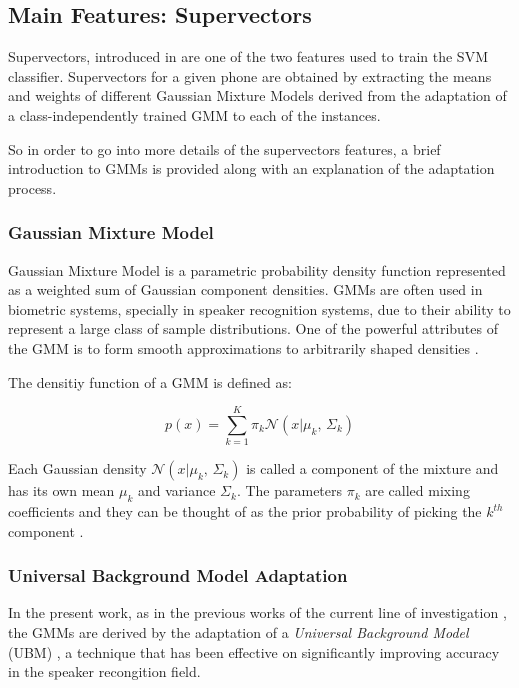 \subsection{Main Features: Supervectors}

Supervectors, introduced in \cite{main} are one of the two features used to train the SVM
classifier. Supervectors for a given phone are obtained by extracting the means and weights
of different
Gaussian Mixture Models derived from the adaptation of a class-independently trained GMM
to each of the instances.

So in order to go into more details of the supervectors features, a brief introduction to
GMMs is provided along with an explanation of the adaptation process.

\subsubsection{Gaussian Mixture Model}

Gaussian Mixture Model is a parametric probability density function represented as a weighted
sum of Gaussian component densities. GMMs are often used in biometric systems, specially
in speaker recognition systems, due to their ability to represent a large class of sample
distributions. One of the powerful attributes of the GMM is to form smooth approximations to
arbitrarily shaped densities \cite{gmm_reynolds}.

The densitiy function of a GMM is defined as:

\begin{equation}
  p(x) = \sum_{k=1}^{K}\pi_{k} \mathcal{N}(x|\mu_{k},\,\Sigma_{k})
\end{equation}

Each Gaussian density $\mathcal{N}(x|\mu_{k},\,\Sigma_{k})$ is called a component of the mixture
and has its own mean $\mu_{k}$ and variance $\Sigma_{k}$. The parameters $\pi_{k}$ are called
mixing coefficients and they can be thought of as the prior probability of picking the $k^{th}$
component \cite{gmm_bishop}.

\subsubsection{Universal Background Model Adaptation}

In the present work, as in the previous works of the current line of investigation
\cite{detection_phone_level_mispronunciation_learning, main},
the GMMs are derived by the adaptation of a \textit{Universal Background Model} (UBM)
\cite{ubm_adaptation}, a technique that has been effective on significantly improving
accuracy in the speaker recongition field.

